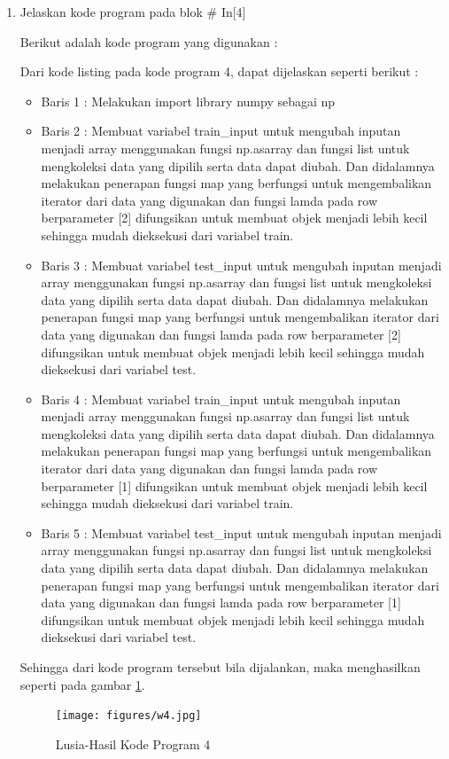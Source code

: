 \begin{enumerate}
\item Jelaskan kode program pada blok \# In[4]
	\par Berikut adalah kode program yang digunakan :
	
	\par Dari kode listing pada kode program 4, dapat dijelaskan seperti berikut :
	\begin{itemize}
	\item Baris 1	: Melakukan import library numpy sebagai np
	\item Baris 2	: Membuat variabel train\_input untuk mengubah inputan menjadi array menggunakan fungsi np.asarray dan  fungsi list untuk mengkoleksi data yang dipilih serta data dapat diubah. Dan didalamnya melakukan penerapan fungsi map yang berfungsi untuk mengembalikan iterator dari data yang digunakan dan fungsi lamda pada row berparameter [2] difungsikan untuk membuat objek menjadi lebih kecil sehingga mudah dieksekusi dari variabel train.
	\item Baris 3	: Membuat variabel test\_input untuk mengubah inputan menjadi array menggunakan fungsi np.asarray dan  fungsi list untuk mengkoleksi data yang dipilih serta data dapat diubah. Dan didalamnya melakukan penerapan fungsi map yang berfungsi untuk mengembalikan iterator dari data yang digunakan dan fungsi lamda pada row berparameter [2] difungsikan untuk membuat objek menjadi lebih kecil sehingga mudah dieksekusi dari variabel test.
	\item Baris 4	: Membuat variabel train\_input untuk mengubah inputan menjadi array menggunakan fungsi np.asarray dan  fungsi list untuk mengkoleksi data yang dipilih serta data dapat diubah. Dan didalamnya melakukan penerapan fungsi map yang berfungsi untuk mengembalikan iterator dari data yang digunakan dan fungsi lamda pada row berparameter [1] difungsikan untuk membuat objek menjadi lebih kecil sehingga mudah dieksekusi dari variabel train.
	\item Baris 5	: Membuat variabel test\_input untuk mengubah inputan menjadi array menggunakan fungsi np.asarray dan  fungsi list untuk mengkoleksi data yang dipilih serta data dapat diubah. Dan didalamnya melakukan penerapan fungsi map yang berfungsi untuk mengembalikan iterator dari data yang digunakan dan fungsi lamda pada row berparameter [1] difungsikan untuk membuat objek menjadi lebih kecil sehingga mudah dieksekusi dari variabel test.
	\end{itemize}
	\par Sehingga dari kode program tersebut bila dijalankan, maka menghasilkan seperti pada gambar \ref{7B4}.
		\begin{figure}[!hbtp]
		\centering
		\texttt{[image: figures/w4.jpg]}
		\caption{Lusia-Hasil Kode Program 4}
		\label{7B4}
		\end{figure}
	

\end{enumerate}

